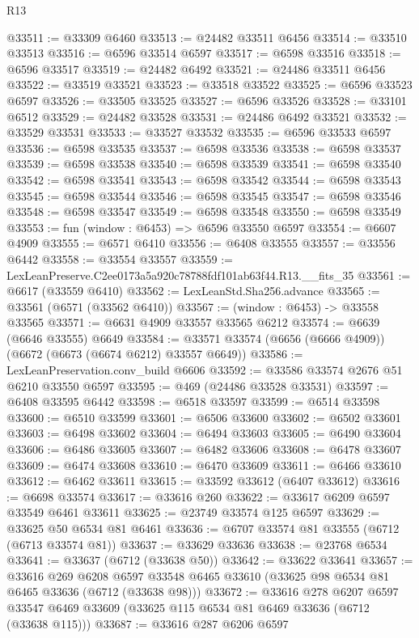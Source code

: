 \begin{lexlean}{R13}
\begin{coremodule}
@33511 := @33309 @6460
@33513 := @24482 @33511 @6456
@33514 := @33510 @33513
@33516 := @6596 @33514 @6597
@33517 := @6598 @33516
@33518 := @6596 @33517
@33519 := @24482 @6492
@33521 := @24486 @33511 @6456
@33522 := @33519 @33521
@33523 := @33518 @33522
@33525 := @6596 @33523 @6597
@33526 := @33505 @33525
@33527 := @6596 @33526
@33528 := @33101 @6512
@33529 := @24482 @33528
@33531 := @24486 @6492 @33521
@33532 := @33529 @33531
@33533 := @33527 @33532
@33535 := @6596 @33533 @6597
@33536 := @6598 @33535
@33537 := @6598 @33536
@33538 := @6598 @33537
@33539 := @6598 @33538
@33540 := @6598 @33539
@33541 := @6598 @33540
@33542 := @6598 @33541
@33543 := @6598 @33542
@33544 := @6598 @33543
@33545 := @6598 @33544
@33546 := @6598 @33545
@33547 := @6598 @33546
@33548 := @6598 @33547
@33549 := @6598 @33548
@33550 := @6598 @33549
@33553 := fun (window : @6453) => @6596 @33550 @6597
@33554 := @6607 @4909
@33555 := @6571 @6410
@33556 := @6408 @33555
@33557 := @33556 @6442
@33558 := @33554 @33557
@33559 := LexLeanPreserve.C2ee0173a5a920c78788fdf101ab63f44.R13.__fits_35
@33561 := @6617 (@33559 @6410)
@33562 := LexLeanStd.Sha256.advance
@33565 := @33561 (@6571 (@33562 @6410))
@33567 := (window : @6453) -> @33558 @33565
@33571 := @6631 @4909 @33557 @33565 @6212
@33574 := @6639 (@6646 @33555) @6649
@33584 := @33571 @33574 (@6656 (@6666 @4909)) (@6672 (@6673 (@6674 @6212) @33557 @6649))
@33586 := LexLeanPreservation.conv_build @6606
@33592 := @33586 @33574 @2676 @51 @6210 @33550 @6597
@33595 := @469 (@24486 @33528 @33531)
@33597 := @6408 @33595 @6442
@33598 := @6518 @33597
@33599 := @6514 @33598
@33600 := @6510 @33599
@33601 := @6506 @33600
@33602 := @6502 @33601
@33603 := @6498 @33602
@33604 := @6494 @33603
@33605 := @6490 @33604
@33606 := @6486 @33605
@33607 := @6482 @33606
@33608 := @6478 @33607
@33609 := @6474 @33608
@33610 := @6470 @33609
@33611 := @6466 @33610
@33612 := @6462 @33611
@33615 := @33592 @33612 (@6407 @33612)
@33616 := @6698 @33574
@33617 := @33616 @260
@33622 := @33617 @6209 @6597 @33549 @6461 @33611
@33625 := @23749 @33574 @125 @6597
@33629 := @33625 @50 @6534 @81 @6461
@33636 := @6707 @33574 @81 @33555 (@6712 (@6713 @33574 @81))
@33637 := @33629 @33636
@33638 := @23768 @6534
@33641 := @33637 (@6712 (@33638 @50))
@33642 := @33622 @33641
@33657 := @33616
    @269
    @6208
    @6597
    @33548
    @6465
    @33610
    (@33625 @98 @6534 @81 @6465 @33636 (@6712 (@33638 @98)))
@33672 := @33616
    @278
    @6207
    @6597
    @33547
    @6469
    @33609
    (@33625 @115 @6534 @81 @6469 @33636 (@6712 (@33638 @115)))
@33687 := @33616
    @287
    @6206
    @6597

\end{coremodule}
\end{lexlean}
